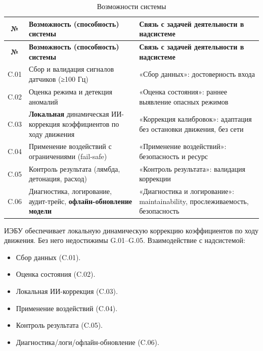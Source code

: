 \documentclass[14pt, a4paper]{extarticle}
\begin{document}
		\vspace{\parindent}
		\noindent
		\begin{xltabular}{\textwidth}{|c|L|L|}
			\caption{Возможности системы}\label{tab:capabilities}\\
			\hline
			\textbf{№} & \textbf{Возможность (способность) системы} & \textbf{Связь с задачей деятельности в надсистеме} \\
			\hline
			\endfirsthead
			\hline
			\textbf{№} & \textbf{Возможность (способность) системы} & \textbf{Связь с задачей деятельности в надсистеме} \\
			\hline
			\endhead
			\hline
			\endfoot
			\hline
			\endlastfoot
			C.01 & Сбор и валидация сигналов датчиков (≥100 Гц) & «Сбор данных»: достоверность входа \\
			\hline
			C.02 & Оценка режима и детекция аномалий & «Оценка состояния»: раннее выявление опасных режимов \\
			\hline
			C.03 & \textbf{Локальная} динамическая ИИ-коррекция коэффициентов по ходу движения & «Коррекция калибровок»: адаптация без остановки движения, без сети \\
			\hline
			C.04 & Применение воздействий с ограничениями (fail-safe) & «Применение воздействий»: безопасность и ресурс \\
			\hline
			C.05 & Контроль результата (лямбда, детонация, расход) & «Контроль результата»: валидация коррекции \\
			\hline
			C.06 & Диагностика, логирование, аудит-трейс, \textbf{офлайн-обновление модели} & «Диагностика и логирование»: maintainability, прослеживаемость, безопасность \\
			\hline
		\end{xltabular}
		\vspace{\parindent}
		
		
		ИЭБУ обеспечивает локальную динамическую коррекцию коэффициентов по ходу движения. Без него недостижимы G.01–G.05. Взаимодействие с надсистемой:
		
		\begin{itemize}
			\item Сбор данных (C.01).
		
			\item Оценка состояния (C.02).
		
			\item Локальная ИИ-коррекция (C.03).
		
			\item Применение воздействий (C.04).
		
			\item Контроль результата (C.05).
		
			\item Диагностика/логи/офлайн-обновление (C.06).
		\end{itemize}
		
\end{document}
